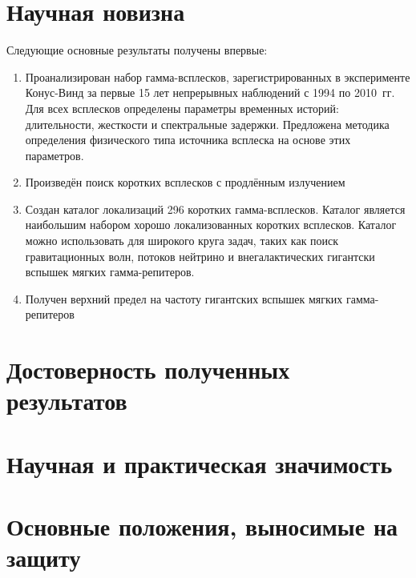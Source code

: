 \section{Научная новизна}
Следующие основные результаты получены впервые:
\begin{enumerate}
\item Проанализирован набор гамма-всплесков, зарегистрированных в эксперименте 
Конус-Винд за первые 15 лет непрерывных наблюдений с 1994 по 2010~гг. Для всех 
всплесков определены параметры временных историй: длительности, жесткости и спектральные задержки.
Предложена методика определения физического типа источника всплеска на основе этих параметров.

\item Произведён поиск коротких всплесков с продлённым излучением 

\item Создан каталог локализаций 296 коротких гамма-всплесков. Каталог является 
наибольшим набором хорошо локализованных коротких всплесков. Каталог можно использовать 
для широкого круга задач, таких как поиск гравитационных волн, потоков нейтрино 
и внегалактических гигантски вспышек мягких гамма-репитеров.

\item Получен верхний предел на частоту гигантских вспышек мягких гамма-репитеров

\end{enumerate}

\section{Достоверность полученных результатов}



\section{Научная и практическая значимость}



\section{Основные положения, выносимые на защиту}




